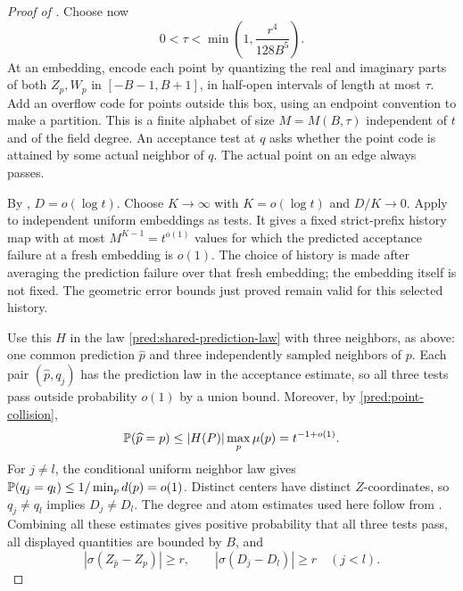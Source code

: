 \begin{proof}[Proof of ]
Choose now
\begin{equation}\label{ht:mesh}
 0<\tau<\min\left(1,\frac{r^4}{128B^5}\right).
\end{equation}
At an embedding, encode each point by quantizing the real and imaginary
parts of both $Z_p,W_p$ in $[-B-1,B+1]$, in half-open intervals of length
at most $\tau$. Add an overflow code for points outside this box, using
an endpoint convention to make a partition. This is a finite alphabet
of size $M=M(B,\tau)$ independent of $t$ and of the field degree.
An acceptance test at $q$ asks whether the point code is attained by
some actual neighbor of $q$. The actual point on an edge always passes.

By , $D=o(\log t)$. Choose $K\to\infty$ with
$K=o(\log t)$ and $D/K\to0$. Apply  to independent
uniform embeddings as tests. It gives a fixed strict-prefix history map
with at most $M^{K-1}=t^{o(1)}$ values for which the predicted acceptance
failure at a fresh embedding is $o(1)$. The choice of history is made
after averaging the prediction failure over that fresh embedding; the
embedding itself is not fixed. The geometric error bounds just proved
remain valid for this selected history.

Use this $H$ in the law \eqref{pred:shared-prediction-law} with three
neighbors, as above: one common prediction
$\widehat p$ and three independently sampled neighbors of $p$.
Each pair $(\widehat p,q_j)$ has the prediction law in the acceptance
estimate, so all three tests pass outside probability $o(1)$ by a union
bound. Moreover, by \eqref{pred:point-collision},
\[
 \mathbb P(\widehat p=p)\le |H(P)|\max_p\mu(p)=t^{-1+o(1)}.
\]
For $j\ne l$, the conditional uniform neighbor law gives
$\mathbb P(q_j=q_l)\le1/\min_p d(p)=o(1)$.
Distinct centers have distinct $Z$-coordinates, so $q_j\ne q_l$ implies
$D_j\ne D_l$. The degree and atom estimates used here follow from
. Combining all these estimates gives positive
probability that all three tests pass, all displayed quantities are
bounded by $B$, and
\begin{equation}\label{ht:separation}
 |\sigma(Z_{\widehat p}-Z_p)|\ge r,\qquad
 |\sigma(D_j-D_l)|\ge r\quad(j<l).
\end{equation}


\end{proof}
